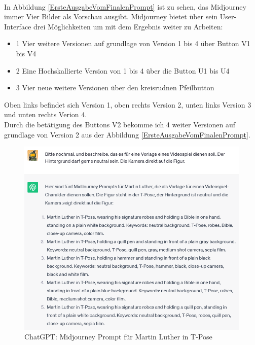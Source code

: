 \\
In Abbildung \ref{ErsteAusgabeVomFinalenPrompt} ist zu sehen, das Midjourney immer Vier Bilder als Vorschau ausgibt. Midjourney bietet über sein User-Interface drei Möglichkeiten um mit dem Ergebnis weiter zu Arbeiten:
\begin{itemize}
	\item 1 Vier weitere Versionen auf grundlage von Version 1 bis 4 über Button V1 bis V4
	\item 2 Eine Hochskallierte Version von 1 bis 4 über die Button U1 bis U4
	\item 3 Vier neue weitere Versionen über den kreisrudnen Pfeilbutton
\end{itemize}
Oben links befindet sich Version 1, oben rechts Version 2, unten links Version 3 und unten rechts Verion 4.
\\
Durch die betätigung des Buttons V2 bekomme ich 4 weiter Versionen auf grundlage von Version 2 aus der Abbildung \ref{ErsteAusgabeVomFinalenPrompt}.
\begin{figure}
	\centering
	\includegraphics[scale=0.7]{BilderFuerBA/10.png}
	\caption{ChatGPT: Midjourney Prompt für Martin Luther in T-Pose}
	\label{chatgptMartinLutherMJmitNeutralenHintergrund}
\end{figure}
